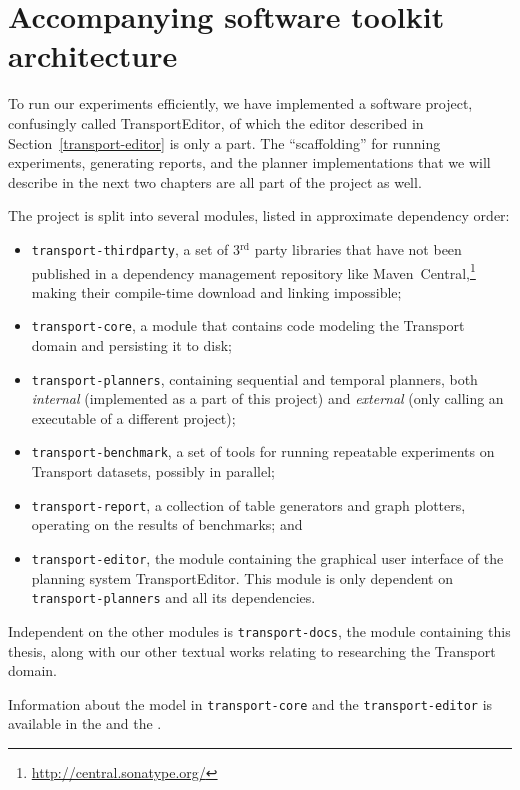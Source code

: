\section{Accompanying software toolkit architecture}\label{transport-project}

To run our experiments efficiently, we have implemented a software project,
confusingly called TransportEditor, of which the editor described in
Section~\ref{transport-editor} is only a part.
The ``scaffolding'' for running experiments, generating reports, and the planner implementations that we will describe in the next two chapters are all part
of the project as well.

The project is split into several modules, listed in approximate dependency order:
\begin{itemize}
\item \texttt{transport-thirdparty}, a set of 3$^\textrm{rd}$ party libraries
that have not been published in a dependency management repository like Maven~Central,\footnote{\url{http://central.sonatype.org/}}
making their compile-time download and linking impossible;
\item \texttt{transport-core}, a module that contains code modeling the Transport
domain and persisting it to disk;
\item \texttt{transport-planners}, containing sequential and temporal planners, both \textit{internal} (implemented as a part of this project) and \textit{external}
(only calling an executable of a different project);
\item \texttt{transport-benchmark}, a set of tools for running repeatable
experiments on Transport datasets, possibly in parallel;
\item \texttt{transport-report}, a collection of table generators and graph plotters,
operating on the results of benchmarks; and
\item \texttt{transport-editor}, the module containing the graphical user interface
of the planning system TransportEditor. This module is only dependent
on \texttt{transport-planners} and all its dependencies.
\end{itemize}
Independent on the other modules is \texttt{transport-docs},
the module containing this thesis,
along with our other textual works relating to researching the Transport domain.

Information about the model in \texttt{transport-core} and the \texttt{transport-editor} is available in the  and the .

